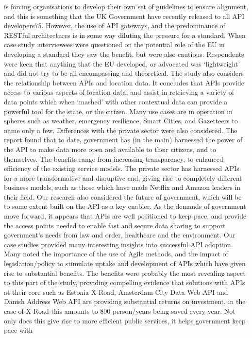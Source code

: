 is forcing organisations to develop their own set of guidelines to ensure alignment, and this is something
that the UK Government have recently released to all API developers75. However, the use of API gateways,
and the predominance of RESTful architectures is in some way diluting the pressure for a standard. When
case study interviewees were questioned on the potential role of the EU in developing a standard they saw
the benefit, but were also cautious. Respondents were keen that anything that the EU developed, or
advocated was ‘lightweight’ and did not try to be all encompassing and theoretical.
The study also considers the relationship between APIs and location data. It concludes that APIs provide
access to various aspects of location data, and assist in retrieving a variety of data points which when
‘mashed’ with other contextual data can provide a powerful tool for the state, or the citizen. Many use cases are in operation in spheres such as weather, emergency resilience, Smart Cities, and Gazetteers to name
only a few.
Differences with the private sector were also considered. The report found that to date, government has (in
the main) harnessed the power of the API to make data more open and available to their citizens, and to
themselves. The benefits range from increasing transparency, to enhanced efficiency of the existing service
models. The private sector has harnessed APIs for a more transformative and disruptive end, giving rise to
completely different business models, such as those which have made Netflix and Amazon leaders in their
field.
Our research also considered the future of government, which will be to some extent built on the API as a
key enabler. As the demands of government move forward, it appears that APIs are well positioned to keep
pace, and provide the access points needed to enable fast and secure data sharing to support
government’s needs from law and order, healthcare and the environment.
Our case studies provided many interesting insights into successful API adoption. Many noted the
importance of the use of Agile methods, and the impact of legislation/policy to stimulate uptake and
development of APIs which have given rise to substantial benefits. The benefits were probably the most
revealing aspect to this part of the study, providing compelling evidence that solutions with APIs at their
core such as Estonia X-Road, Amsterdam City Data Web API and Danish Address Web API are providing
substantial returns on investment, in the case of X-Road this amounts to 800 person/years being saved
every year. Not only does this give rise to more efficient public services, it helps government keep pace with
